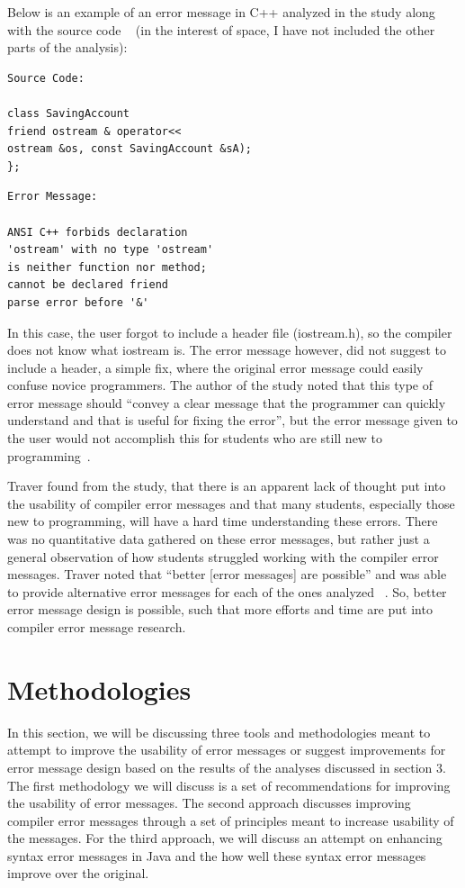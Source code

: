 \documentclass{sig-alternate}
\begin{document}
Below is an example of an error message in C++ analyzed in the study along with the source code ~\cite{Traver:2010} (in the interest of space, I have not included the other parts of the analysis):

\begin{verbatim}
Source Code:

class SavingAccount 
friend ostream & operator<<
ostream &os, const SavingAccount &sA);
};
\end{verbatim}

\begin{verbatim}
Error Message:

ANSI C++ forbids declaration 
'ostream' with no type 'ostream'
is neither function nor method; 
cannot be declared friend
parse error before '&'
\end{verbatim}


In this case, the user forgot to include a header file (iostream.h), so the compiler does not know what iostream is.
The error message however, did not suggest to include a header, a simple fix, where the original error message could easily confuse novice programmers.
The author of the study noted that this type of error message should ``convey a clear message that the programmer can quickly understand and that is useful for fixing the error'', but the error message given to the user would not accomplish this for students who are still new to programming~\cite{Traver:2010}.

Traver found from the study, that there is an apparent lack of thought put into the usability of compiler error messages and that many students, especially those new to programming, will have a hard time understanding these errors.
There was no quantitative data gathered on these error messages, but rather just a general observation of how students struggled working with the compiler error messages.
Traver noted that ``better [error messages] are possible'' and was able to provide alternative error messages for each of the ones analyzed ~\cite{Traver:2010}.
So, better error message design is possible, such that more efforts and time are put into compiler error message research. 

\section{Methodologies}\label{sec:methodologies}
In this section, we will be discussing three tools and methodologies meant to attempt to improve the usability of error messages or suggest improvements for error message design based on the results of the analyses discussed in section 3.
The first methodology we will discuss is a set of recommendations for improving the usability of error messages.
The second approach discusses improving compiler error messages through a set of principles meant to increase usability of the messages.
For the third approach, we will discuss an attempt on enhancing syntax error messages in Java and the how well these syntax error messages improve over the original. 
\end{document}
